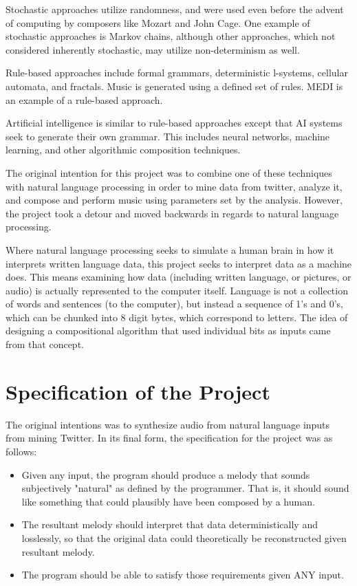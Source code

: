 \documentclass[runningheads,a4paper]{llncs}
\begin{document}
Stochastic approaches utilize randomness, and were used even before the advent
of computing by composers like Mozart and John Cage. One example of stochastic
approaches is Markov chains, although other
approaches, which not considered inherently stochastic, may utilize
non-determinism as well.

Rule-based approaches include formal grammars, deterministic l-systems, cellular
automata, and fractals. Music is generated using a defined set of rules. MEDI is
an example of a rule-based approach.

Artificial intelligence is similar to rule-based approaches except that AI systems
seek to generate their own grammar. This includes neural networks, machine
learning, and other algorithmic composition techniques.

The original intention for this project was to combine one of these techniques
with natural language processing in order to mine data from twitter, analyze it,
and compose and perform music using parameters set by the analysis. However, the
project took a detour and moved backwards in regards to natural language
processing.

Where natural language processing seeks to simulate a human brain in how it
interprets written language data, this project seeks to interpret data as a
machine does. This means examining how data (including written language, or pictures,
or audio) is actually represented to the computer itself. Language is not a
collection of words and sentences (to the computer), but instead a sequence of
1's and 0's, which can be chunked into 8 digit bytes, which correspond to
letters. The idea of designing a compositional algorithm that used individual bits as
inputs came from that concept.

\section{Specification of the Project}

The original intentions was to synthesize audio from natural language inputs
from mining Twitter. In its final form, the specification for the project was as
follows:

\begin{itemize}
\item Given any input, the program should produce a melody that sounds
subjectively "natural" as defined by the programmer. That is, it should sound
like something that could plausibly have been composed by a human.

\item The resultant melody should interpret that data deterministically and
losslessly, so that the original data could theoretically be reconstructed given
resultant melody.

\item The program should be able to satisfy those requirements given ANY input.
\end{itemize}
\end{document}
